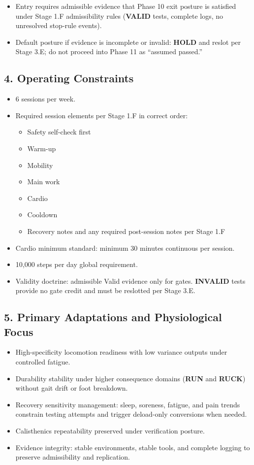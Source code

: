\documentclass[10pt]{article}
\begin{document}
\begin{itemize}
\item Entry requires admissible evidence that Phase 10 exit posture is satisfied under Stage 1.F admissibility rules (\textbf{VALID} tests, complete logs, no unresolved stop-rule events).
\item Default posture if evidence is incomplete or invalid: \textbf{HOLD} and reslot per Stage 3.E; do not proceed into Phase 11 as “assumed passed.”
\end{itemize}

\subsection*{4. Operating Constraints}

\begin{itemize}
\item 6 sessions per week.
\item Required session elements per Stage 1.F in correct order:
  \begin{itemize}
  \item Safety self-check first
  \item Warm-up
  \item Mobility
  \item Main work
  \item Cardio
  \item Cooldown
  \item Recovery notes and any required post-session notes per Stage 1.F
  \end{itemize}
\item Cardio minimum standard: minimum 30 minutes continuous per session.
\item 10,000 steps per day global requirement.
\item Validity doctrine: admissible Valid evidence only for gates. \textbf{INVALID} tests provide no gate credit and must be reslotted per Stage 3.E.
\end{itemize}

\subsection*{5. Primary Adaptations and Physiological Focus}

\begin{itemize}
\item High-specificity locomotion readiness with low variance outputs under controlled fatigue.
\item Durability stability under higher consequence domains (\textbf{RUN} and \textbf{RUCK}) without gait drift or foot breakdown.
\item Recovery sensitivity management: sleep, soreness, fatigue, and pain trends constrain testing attempts and trigger deload-only conversions when needed.
\item Calisthenics repeatability preserved under verification posture.
\item Evidence integrity: stable environments, stable tools, and complete logging to preserve admissibility and replication.
\end{itemize}
\end{document}
